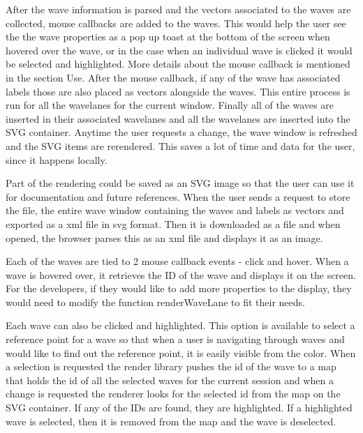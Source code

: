 \documentclass[14pt]{extarticle}
\begin{document}
\par After the wave information is parsed and the vectors associated to the waves are collected, mouse callbacks are added to the waves. This would help the user see the the wave properties as a pop up toast at the bottom of the screen when hovered over the wave, or in the case when an individual wave is clicked it would be selected and highlighted. More details about the mouse callback is mentioned in the section Use. After the mouse callback, if any of the wave has associated labels those are also placed as vectors alongside the waves. This entire process is run for all the wavelanes for the current window. Finally all of the waves are inserted in their associated wavelanes and all the wavelanes are inserted into the SVG container. Anytime the user requests a change, the wave window is refreshed and the SVG items are rerendered. This saves a lot of time and data for the user, since it happens locally.

 
\par Part of the rendering could be saved as an SVG image so that the user can use it for documentation and future references. When the user sends a request to store the file, the entire wave window containing the waves and labels as vectors and exported as a xml file in svg format. Then it is downloaded as a file and when opened, the browser parses this as an xml file and displays it as an image.
 
\par Each of the waves are tied to 2 mouse callback events - click and hover. When a wave is hovered over, it retrieves the ID of the wave and displays it on the screen. For the developers, if they would like to add more properties to the display, they would need to modify the function renderWaveLane to fit their needs.

\par Each wave can also be clicked and highlighted. This option is available to select a reference point for a wave so that when a user is navigating through waves and would like to find out the reference point, it is easily visible from the color. When a selection is requested the render library pushes the id of the wave to a map that holds the id of all the selected waves for the current session and when a change is requested the renderer looks for the selected id from the map on the SVG container. If any of the IDs are found, they are highlighted. If a highlighted wave is selected, then it is removed from the map and the wave is deselected.
\end{document}
